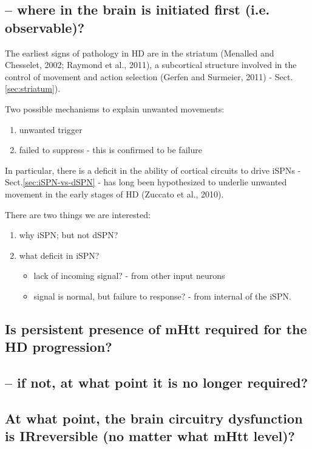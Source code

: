 \subsection{-- where in the brain is initiated first (i.e. observable)?}

The earliest signs of pathology in HD are in the striatum (Menalled and
Chesselet, 2002; Raymond et al., 2011), a subcortical structure involved in the
control of movement and action selection (Gerfen and Surmeier, 2011) -
Sect.\ref{sec:striatum}).

Two possible mechanisms to explain unwanted movements:
\begin{enumerate}
  \item unwanted trigger 
  \item failed to suppress - this is confirmed to be failure 
\end{enumerate}
In particular, there is a deficit in the ability of cortical circuits to drive
iSPNs - Sect.\ref{sec:iSPN-vs-dSPN} - has long been hypothesized to underlie
unwanted movement in the early stages of HD (Zuccato et al., 2010).

There are two things we are interested:
\begin{enumerate}
  \item why iSPN; but not dSPN?
  
  \item what deficit in iSPN?
  \begin{itemize}
    \item lack of incoming signal? - from other input neurons
    
    \item signal is normal, but failure to response? - from internal of the
    iSPN.
  \end{itemize}
\end{enumerate}


\subsection{Is persistent presence of mHtt required for the HD progression?}

\subsection{-- if not, at what point it is no longer required?}

\subsection{At what point, the brain circuitry dysfunction is IRreversible (no
matter what mHtt level)?}

